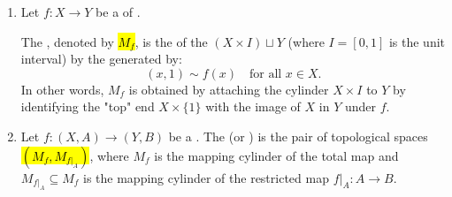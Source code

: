 \begin{definition} \label{definition:mapping_cylinder_of_a_map_of_topological_spaces_and_pairs}

\begin{enumerate}
    \item Let $f: X \to Y$ be a  of .

    The , denoted by \hl{$M_f$}, is the  of the  $(X \times I) \sqcup Y$ (where $I = [0, 1]$ is the unit interval) by the  generated by:
    $$ (x, 1) \sim f(x) \quad \text{for all } x \in X. $$
    In other words, $M_f$ is obtained by attaching the cylinder $X \times I$ to $Y$ by identifying the "top" end $X \times \{1\}$ with the image of $X$ in $Y$ under $f$.

    \item Let $f: (X, A) \to (Y, B)$ be a .
    The  (or ) is the pair of topological spaces \hl{$(M_f, M_{f|_A})$}, where $M_f$ is the mapping cylinder of the total map and $M_{f|_A} \subseteq M_f$ is the mapping cylinder of the restricted map $f|_A: A \to B$.
\end{enumerate}
\end{definition}